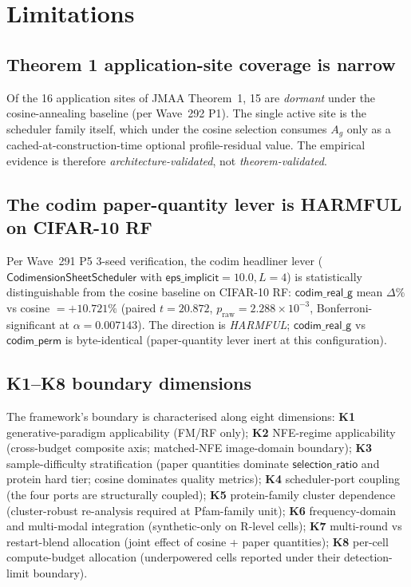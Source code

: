 \documentclass[journal,twocolumn,final]{IEEEtran}
\newcommand{\pr}{p_{\mathrm{raw}}}
\newcommand{\sheetA}{A_g}
\begin{document}
\section{Limitations}\label{sec:limitations}

\subsection*{Theorem 1 application-site coverage is narrow}

Of the 16 application sites of JMAA Theorem~1, 15 are \emph{dormant} under the
cosine-annealing baseline (per Wave~292 P1). The single active site is the
scheduler family itself, which under the cosine selection consumes $\sheetA$
only as a cached-at-construction-time optional profile-residual value. The
empirical evidence is therefore \emph{architecture-validated}, not
\emph{theorem-validated}.

\subsection*{The codim paper-quantity lever is HARMFUL on CIFAR-10 RF}

Per Wave~291 P5 3-seed verification, the codim headliner lever
($\mathsf{CodimensionSheetScheduler}$ with $\mathsf{eps\_implicit}=10.0, L=4$)
is statistically distinguishable from the cosine baseline on CIFAR-10 RF:
$\mathsf{codim\_real\_g}$ mean $\Delta\%$ vs cosine $= +10.721\%$ (paired
$t = 20.872$, $\pr = 2.288\!\times\!10^{-3}$, Bonferroni-significant at $\alpha
= 0.007143$). The direction is \emph{HARMFUL}; $\mathsf{codim\_real\_g}$ vs
$\mathsf{codim\_perm}$ is byte-identical (paper-quantity lever inert at this
configuration).

\subsection*{K1--K8 boundary dimensions}

The framework's boundary is characterised along eight dimensions: \textbf{K1}
generative-paradigm applicability (FM/RF only); \textbf{K2} NFE-regime
applicability (cross-budget composite axis; matched-NFE image-domain boundary);
\textbf{K3} sample-difficulty stratification (paper quantities dominate
$\mathsf{selection\_ratio}$ and protein hard tier; cosine dominates quality
metrics); \textbf{K4} scheduler-port coupling (the four ports are structurally
coupled); \textbf{K5} protein-family cluster dependence (cluster-robust
re-analysis required at Pfam-family unit); \textbf{K6} frequency-domain and
multi-modal integration (synthetic-only on R-level cells); \textbf{K7}
multi-round vs restart-blend allocation (joint effect of cosine + paper
quantities); \textbf{K8} per-cell compute-budget allocation (underpowered cells
reported under their detection-limit boundary).
\end{document}
